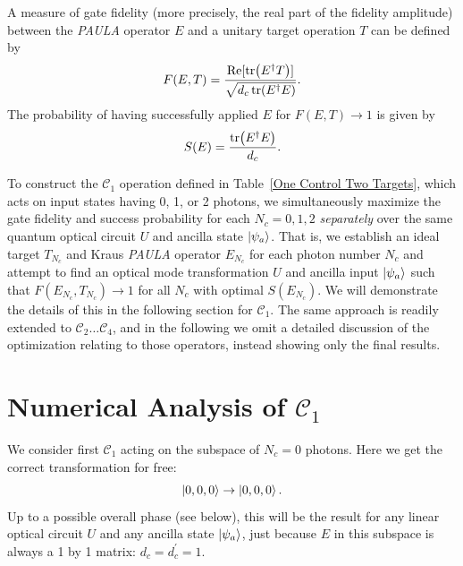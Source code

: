 \documentclass[aps,pra,twocolumn,superscriptaddress,floatfix,10pt]{revtex4}
\begin{document}
A measure of gate fidelity (more precisely, the real part of the fidelity amplitude) between the \textit{PAULA} operator $E$ and a unitary target operation $T$ can be defined by
\begin{equation}
\label{Gate Fidelity}
F(E,T) = \frac{\Re[\tr(E^\dagger T)]}{\sqrt{d_c \tr(E^\dagger E)} }.
\end{equation}
The probability of having successfully applied $E$ for $F(E,T) \rightarrow 1$ is given by
\begin{equation}
\label{Success Probability} 
S(E) = \frac{\tr(E^\dagger E)}{d_c}.
\end{equation}

To construct the $\mathcal{C}_1$ operation defined in Table~\ref{One Control Two Targets}, which acts on input states having 0, 1, or 2 photons, we simultaneously maximize the gate fidelity and success probability for each  $N_c=0,1,2$ \textit{separately} over the same quantum optical circuit $U$ and ancilla state $\ket{\psi_a}$. That is, we establish an ideal target $T_{N_c}$ and Kraus \textit{PAULA} operator $E_{N_c}$ for each photon number $N_c$ and attempt to find an optical mode transformation $U$ and ancilla input $\ket{\psi_a}$ such that  $F(E_{N_c},T_{N_c}) \rightarrow 1$ for all $N_c$ with optimal $S(E_{N_c})$. We will demonstrate the details of this in the following section for $\mathcal{C}_1$. The same approach is readily extended to $\mathcal{C}_2 \dots \mathcal{C}_4$, and in the following we omit a detailed discussion of the optimization relating to those operators, instead showing only the final results.
\section{Numerical Analysis of $\mathcal{C}_1$}
\label{Section Numerical Testing}
We consider first $\mathcal{C}_1$ acting on the subspace of $N_c=0$ photons. Here we get the correct transformation for free:
\begin{equation}
\label{Free Operation}
\ket{0,0,0} \rightarrow \ket{0,0,0}.
\end{equation}
Up to a possible overall phase (see below), this will be the result for any linear optical circuit  $U$ and any ancilla state $\ket{\psi_a}$, just because $E$ in this subspace is always a 1 by 1 matrix: $d_c = d_c^\prime = 1$.
\end{document}
